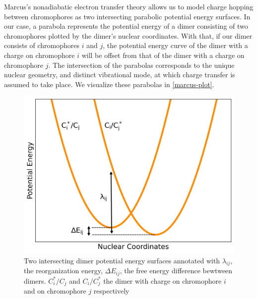 Marcus's nonadiabatic electron transfer theory allows us to model charge hopping between chromophores as two
intersecting parabolic potential energy surfaces. 
In our case, a parabola represents the potential energy of a dimer consisting of two chromophores plotted by 
the dimer's nuclear coordinates. 
With that, if our dimer consists of chromophores $i$ and $j$, the potential energy curve of the dimer with a
charge on chromophore $i$ will be offset from that of the dimer with a charge on chromophore $j$. The
intersection of the parabolas corresponds to the unique nuclear geometry, and distinct vibrational mode, at
which charge transfer is assumed to take place. We visualize these parabolas in \autoref{marcus-plot}.
\begin{figure}
  \center
  \includegraphics[width=0.99\linewidth]{figures/marcus-plot.png} 
    \caption{Two intersecting dimer potential energy surfaces annotated with $\lambda_{ij}$, the
    reorganization energy, $\Delta E_{ij}$, the free energy difference bewtween dimers. $C_{i}^*/C_{j}$ 
    and $C_{i}/C_{j}^*$ the dimer with charge on chromophore $i$ and on chromophore $j$ respectively}
  \label{marcus-plot}
\end{figure}

